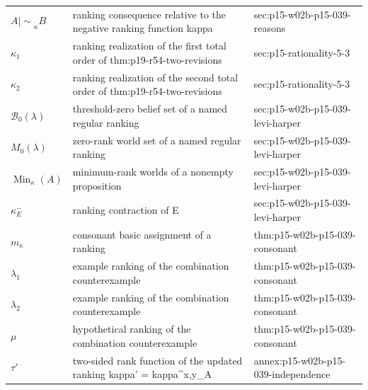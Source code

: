 \begin{longtable}{@{}p{}p{}p{}@{}}
\(A\mathrel{|\!\sim}_\kappa B\) & ranking consequence relative to the negative ranking function kappa & sec:\allowbreak{}p15-\allowbreak{}w02b-\allowbreak{}p15-\allowbreak{}039-\allowbreak{}reasons \\
\(\kappa_1\) & ranking realization of the first total order of thm:p19-r54-two-revisions & sec:\allowbreak{}p15-\allowbreak{}rationality-\allowbreak{}5-\allowbreak{}3 \\
\(\kappa_2\) & ranking realization of the second total order of thm:p19-r54-two-revisions & sec:\allowbreak{}p15-\allowbreak{}rationality-\allowbreak{}5-\allowbreak{}3 \\
\(\mathcal B_0(\lambda)\) & threshold-zero belief set of a named regular ranking & sec:\allowbreak{}p15-\allowbreak{}w02b-\allowbreak{}p15-\allowbreak{}039-\allowbreak{}levi-\allowbreak{}harper \\
\(M_0(\lambda)\) & zero-rank world set of a named regular ranking & sec:\allowbreak{}p15-\allowbreak{}w02b-\allowbreak{}p15-\allowbreak{}039-\allowbreak{}levi-\allowbreak{}harper \\
\(\operatorname{Min}_\kappa(A)\) & minimum-rank worlds of a nonempty proposition & sec:\allowbreak{}p15-\allowbreak{}w02b-\allowbreak{}p15-\allowbreak{}039-\allowbreak{}levi-\allowbreak{}harper \\
\(\kappa^{-}_E\) & ranking contraction of E & sec:\allowbreak{}p15-\allowbreak{}w02b-\allowbreak{}p15-\allowbreak{}039-\allowbreak{}levi-\allowbreak{}harper \\
\(m_\kappa\) & consonant basic assignment of a ranking & thm:\allowbreak{}p15-\allowbreak{}w02b-\allowbreak{}p15-\allowbreak{}039-\allowbreak{}consonant \\
\(\lambda_1\) & example ranking of the combination counterexample & thm:\allowbreak{}p15-\allowbreak{}w02b-\allowbreak{}p15-\allowbreak{}039-\allowbreak{}consonant \\
\(\lambda_2\) & example ranking of the combination counterexample & thm:\allowbreak{}p15-\allowbreak{}w02b-\allowbreak{}p15-\allowbreak{}039-\allowbreak{}consonant \\
\(\mu\) & hypothetical ranking of the combination counterexample & thm:\allowbreak{}p15-\allowbreak{}w02b-\allowbreak{}p15-\allowbreak{}039-\allowbreak{}consonant \\
\(\tau'\) & two-sided rank function of the updated ranking kappa' = kappa\^{}{x,y}\_A & annex:\allowbreak{}p15-\allowbreak{}w02b-\allowbreak{}p15-\allowbreak{}039-\allowbreak{}independence \\

\end{longtable}
